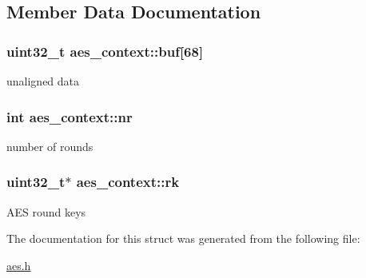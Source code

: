 \subsection{Member Data Documentation}
\hypertarget{structaes__context_a5b40a8d4bfd83ebbfff914cd8f561afa}{
\subsubsection[{buf}]{\setlength{\rightskip}{0pt plus 5cm}uint32\_\-t {\bf aes\_\-context::buf}\mbox{[}68\mbox{]}}}
\label{structaes__context_a5b40a8d4bfd83ebbfff914cd8f561afa}
unaligned data \hypertarget{structaes__context_af05054b9a37a06446ef0abf43cd97520}{
\subsubsection[{nr}]{\setlength{\rightskip}{0pt plus 5cm}int {\bf aes\_\-context::nr}}}
\label{structaes__context_af05054b9a37a06446ef0abf43cd97520}
number of rounds \hypertarget{structaes__context_a93db0195022595f748c001221cc31abe}{
\subsubsection[{rk}]{\setlength{\rightskip}{0pt plus 5cm}uint32\_\-t$\ast$ {\bf aes\_\-context::rk}}}
\label{structaes__context_a93db0195022595f748c001221cc31abe}
AES round keys 

The documentation for this struct was generated from the following file:\begin{DoxyCompactItemize}
\item 
\hyperlink{aes_8h}{aes.h}\end{DoxyCompactItemize}
